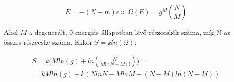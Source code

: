\documentclass[a4paper,12pt]{article}
\begin{document}
\begin{equation*}
E = -(N-m)\epsilon \approx \Omega(E) = g^{M}\binom N M
\end{equation*}

\par Ahol $M$ a degenerált, $0$ energiás állapotban lévő részecskék száma, míg N az összes részecske száma. Ekkor $S = kln(\Omega)$:

\begin{equation}
\begin{gathered}
S = k\Big(Mln(g) + ln(\frac{N!}{M!(N-M)!})\Big) = \\
= kMln(g) + k(NlnN - MlnM - (N-M)ln(N-M))
\end{gathered}
\end{equation}
\end{document}
